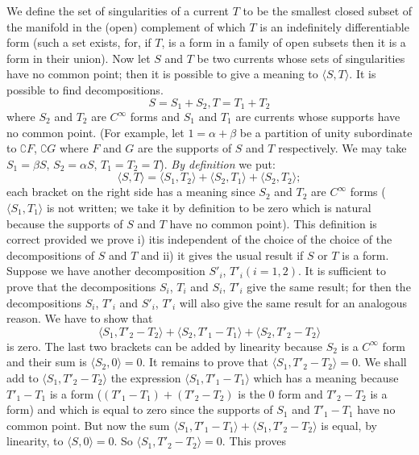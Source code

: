 We define the set of singularities of a current $T$ to be the smallest
closed subset of the manifold in the (open) complement of which $T$ is
an indefinitely differentiable form (such a set exists, for, if $T$,
is a form in a family of open subsets then it is a form in their
union). Now let $S$ and $T$ be two currents whose sets of
singularities have no common point; then it is possible to give a
meaning to $\langle S,T\rangle$. It is possible to find
decompositions. 
$$
S=S_{1}+S_{2}, T=T_{1}+T_{2}
$$
where $S_{2}$ and $T_{2}$ are $C^{\infty}$ forms and $S_{1}$ and
$T_{1}$ are currents whose supports have no common point. (For
example, let $1=\alpha+\beta$ be a partition of unity subordinate to
$\complement F$, $\complement G$ where $F$ and $G$ are the supports of
$S$ and $T$ respectively. We may take $S_{1}=\beta S$,  $S_{2}=\alpha
S$, $T_{1}=T_{2}=T$). {\em By definition} we put:
$$
\langle S,T\rangle=\langle S_{1},T_{2}\rangle+\langle
S_{2},T_{1}\rangle+\langle S_{2},T_{2}\rangle;
$$
each bracket on the right side has a meaning since $S_{2}$ and $T_{2}$
are $C^{\infty}$ forms ($\langle S_{1},T_{1}\rangle$ is not written;
we take it by definition to be zero which is natural because the
supports of $S$ and $T$ have no common point). This definition is
correct provided we prove i) it\pageoriginale is independent of the
choice of the choice of the decompositions of $S$ and $T$ and ii) it
gives the usual result if $S$ or $T$ is a form. Suppose we have
another decomposition $S'_{i}$, $T'_{i}(i=1,2)$. It is sufficient to
prove that the decompositions $S_{i}$, $T_{i}$ and $S_{i}$, $T'_{i}$
give the same result; for then the decompositions $S_{i}$, $T'_{i}$
and $S'_{i}$, $T'_{i}$ will also give the same result for an analogous
reason. We have to show that
$$
\langle S_{1},T'_{2}-T_{2}\rangle+\langle
S_{2},T'_{1}-T_{1}\rangle+\langle S_{2},T'_{2}-T_{2}\rangle
$$
is zero. The last two brackets can be added by linearity because
$S_{2}$ is a $C^{\infty}$ form and their sum is $\langle
S_{2},0\rangle=0$. It remains to prove that $\langle
S_{1},T'_{2}-T_{2}\rangle=0$. We shall add to $\langle S_{1},
T'_{2}-T_{2}\rangle$ the expression $\langle
S_{1},T'_{1}-T_{1}\rangle$ which has a meaning because $T'_{1}-T_{1}$
is a form ($(T'_{1}-T_{1})+(T'_{2}-T_{2})$ is the $0$ form and
$T'_{2}-T_{2}$ is a form) and which is equal to zero since the
supports of $S_{1}$ and $T'_{1}-T_{1}$ have no common point. But now
the sum $\langle S_{1},T'_{1}-T_{1}\rangle+\langle
S_{1},T'_{2}-T_{2}\rangle$ is equal, by linearity, to $\langle
S,0\rangle=0$. So $\langle S_{1},T'_{2}-T_{2}\rangle=0$. This proves
